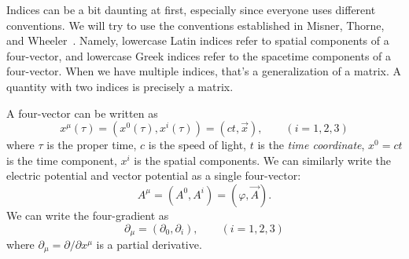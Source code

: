 Indices can be a bit daunting at first, especially since everyone
uses different conventions. We will try to use the conventions
established in Misner, Thorne, and
Wheeler~\cite{MisnerThorneWheeler}. Namely, lowercase Latin indices refer
to spatial components of a four-vector, and lowercase Greek
indices refer to the spacetime components of a four-vector. When
we have multiple indices, that's a generalization of a matrix. A
quantity with two indices is precisely a matrix.

A four-vector can be written as
\begin{equation}%
x^{\mu}(\tau) = \left(x^{0}(\tau),x^{i}(\tau)\right)= (ct,\vec{x}),\qquad(i=1,2,3)
\end{equation}
where $\tau$ is the proper time, $c$ is the speed of light, $t$
is the \emph{time coordinate}, $x^{0}=ct$ is the time component,
$x^{i}$ is the spatial components. We can similarly write the
electric potential and vector potential as a single four-vector:
\begin{equation}%
A^{\mu} = (A^{0},A^{i}) = (\varphi,\vec{A}).
\end{equation}
We can write the four-gradient as
\begin{equation}%
\partial_{\mu} = (\partial_{0},\partial_{i}),\qquad(i=1,2,3)
\end{equation}
where $\partial_{\mu}=\partial/\partial x^{\mu}$ is a partial
derivative.

